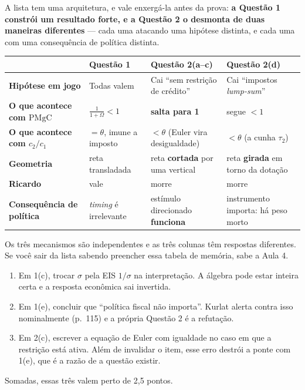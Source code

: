 \documentclass[11pt, a4paper]{article}
\begin{document}
\begin{tcolorbox}[theorybox, title={O que a Lista 3 está realmente testando}]
\small
A lista tem uma arquitetura, e vale enxergá-la antes da prova: \textbf{a Questão 1 constrói
um resultado forte, e a Questão 2 o desmonta de duas maneiras diferentes} --- cada uma
atacando uma hipótese distinta, e cada uma com uma consequência de política distinta.

\smallskip
\begin{center}
\small
\renewcommand{\arraystretch}{1.35}
\begin{tabular}{@{}lp{4.3cm}p{4.5cm}p{4.0cm}@{}}
\toprule
& \textbf{Questão 1} & \textbf{Questão 2(a--c)} & \textbf{Questão 2(d)} \\
\midrule
\textbf{Hipótese em jogo}
 & Todas valem
 & Cai ``sem restrição de crédito''
 & Cai ``impostos \emph{lump-sum}'' \\
\textbf{O que acontece com $\mathrm{PMgC}$}
 & $\frac{1}{1+\Omega}<1$
 & \textbf{salta para 1}
 & segue $<1$ \\
\textbf{O que acontece com $c_2/c_1$}
 & $=\theta$, imune a imposto
 & $<\theta$ (Euler vira desigualdade)
 & \textbf{$<\theta$} (a cunha $\tau_2$) \\
\textbf{Geometria}
 & reta transladada
 & reta \textbf{cortada} por uma vertical
 & reta \textbf{girada} em torno da dotação \\
\textbf{Ricardo}
 & vale
 & morre
 & morre \\
\textbf{Consequência de política}
 & \emph{timing} é irrelevante
 & estímulo direcionado \textbf{funciona}
 & instrumento importa: há peso morto \\
\bottomrule
\end{tabular}
\end{center}

\smallskip
Os três mecanismos são independentes e as três colunas têm respostas diferentes. Se você
sair da lista sabendo preencher essa tabela de memória, sabe a Aula 4.
\end{tcolorbox}

\begin{tcolorbox}[trapbox, title={As três armadilhas mais caras da lista}]
\small
\begin{enumerate}[label=(\roman*)]
\item Em 1(c), trocar $\sigma$ pela EIS $1/\sigma$ na interpretação. A álgebra pode estar
inteira certa e a resposta econômica sai invertida.
\item Em 1(e), concluir que ``política fiscal não importa''. Kurlat alerta contra isso
nominalmente (p.\ 115) e a própria Questão 2 é a refutação.
\item Em 2(c), escrever a equação de Euler com igualdade no caso em que a restrição está
ativa. Além de invalidar o item, esse erro destrói a ponte com 1(e), que é a razão de a
questão existir.
\end{enumerate}
Somadas, essas três valem perto de 2,5 pontos.
\end{tcolorbox}
\end{document}

